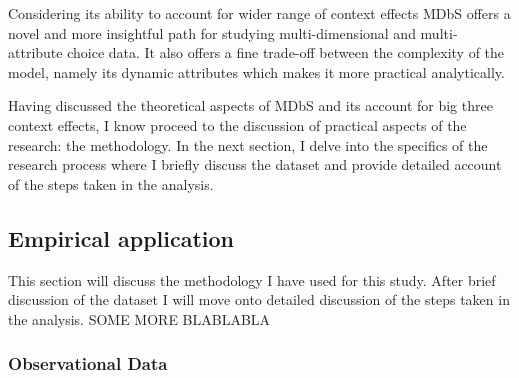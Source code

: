 \documentclass[a4paper,12pt]{article}
\begin{document}
Considering its ability to account for wider range of context effects MDbS offers a novel and more insightful path for studying multi-dimensional and multi-attribute choice data. It also offers a fine trade-off between the complexity of the model, namely its dynamic attributes which makes it more practical analytically. 

Having discussed the theoretical aspects of MDbS and its account for big three context effects, I know proceed to the discussion of practical aspects of the research: the methodology. In the next section, I delve into the specifics of the research process where I briefly discuss the dataset and provide detailed account of the steps taken in the analysis.

\subsection{Empirical application}

This section will discuss the methodology I have used for this study. After brief discussion of the dataset I will move onto detailed discussion of the steps taken in the analysis. SOME MORE BLABLABLA

\subsubsection{Observational Data}\label{section:observationalDataDescription}
\end{document}
